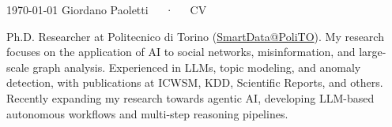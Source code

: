 \documentclass[11pt, a4paper]{awesome-cv}
\begin{document}
\makecvheader[C]

\makecvfooter
  {\today}
  {Giordano Paoletti~~~·~~~CV}
  {\thepage}



\begin{cvparagraph}
Ph.D. Researcher at Politecnico di Torino (\href{https://smartdata.polito.it/members/giordano-paoletti/}{\color{darkblue}SmartData@PoliTO}). My research focuses on the application of AI to social networks, misinformation, and large-scale graph analysis. Experienced in LLMs, topic modeling, and anomaly detection, with publications at ICWSM, KDD, Scientific Reports, and others. Recently expanding my research towards agentic AI, developing LLM-based autonomous workflows and multi-step reasoning pipelines.
\end{cvparagraph}







% 

\end{document}
